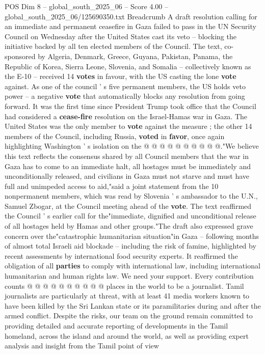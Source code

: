 \begin{textsample}{POS Dim 8 – global\_south\_2025\_06 – Score 4.00 – global\_south\_2025\_06/125690350.txt}  \label{ex:f8_pos_426}
Breadcrumb A draft resolution calling for an immediate and permanent ceasefire in Gaza failed to pass in the UN Security Council on Wednesday after the United States cast its veto -- blocking the initiative backed by all ten elected members of the Council.
The text, co-sponsored by Algeria, Denmark, Greece, Guyana, Pakistan, Panama, the Republic of Korea, Sierra Leone, Slovenia, and Somalia -- collectively known as the E-10 -- received 14 \textbf{votes} in favour, with the US casting the lone \textbf{vote} against.
As one of the council ' s five permanent members, the US holds veto power -- a negative \textbf{vote} that automatically blocks any resolution from going forward.
It was the first time since President Trump took office that the Council had considered a \textbf{cease-fire} resolution on the Israel-Hamas war in Gaza.
The United States was the only member to \textbf{vote} against the measure ; the other 14 members of the Council, including Russia, \textbf{voted} in \textbf{favor}, once again highlighting Washington ' s isolation on the @ @ @ @ @ @ @ @ @ @."We believe this text reflects the consensus shared by all Council members that the war in Gaza has to come to an immediate halt, all hostages must be immediately and unconditionally released, and civilians in Gaza must not starve and must have full and unimpeded access to aid,"said a joint statement from the 10 nonpermanent members, which was read by Slovenia ' s ambassador to the U.N., Samuel Zbogar, at the Council meeting ahead of the \textbf{vote}.
The text reaffirmed the Council ' s earlier call for the"immediate, dignified and unconditional release of all hostages held by Hamas and other groups."The draft also expressed grave concern over the"catastrophic humanitarian situation"in Gaza -- following months of almost total Israeli aid blockade -- including the risk of famine, highlighted by recent assessments by international food security experts.
It reaffirmed the obligation of all \textbf{parties} to comply with international law, including international humanitarian and human rights law.
We need your support.
Every contribution counts @ @ @ @ @ @ @ @ @ @ places in the world to be a journalist.
Tamil journalists are particularly at threat, with at least 41 media workers known to have been killed by the Sri Lankan state or its paramilitaries during and after the armed conflict.
Despite the risks, our team on the ground remain committed to providing detailed and accurate reporting of developments in the Tamil homeland, across the island and around the world, as well as providing expert analysis and insight from the Tamil point of view

\end{textsample}
